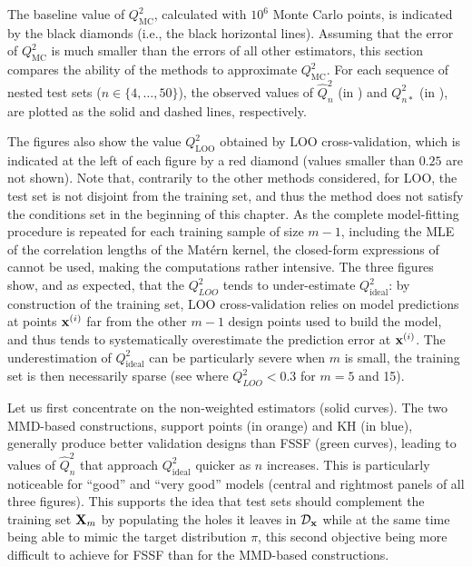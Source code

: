 The baseline value of $Q_{\mathrm{MC}}^2$, calculated with $10^6$ Monte Carlo points, is indicated by the black diamonds (i.e., the black horizontal lines).
Assuming that the error of $Q_{\mathrm{MC}}^2$ is much smaller than the errors of all other estimators, this section compares the ability of the methods to approximate $Q_{\mathrm{MC}}^2$. 
For each sequence of nested test sets ($n\in\{4,\ldots,50\}$), the observed values of $\widehat Q^2_n$ (in ) and $Q_{n*}^2$ (in ), are plotted as the solid and dashed lines, respectively. 

The figures also show the value $Q^2_{\mathrm{LOO}}$ obtained by LOO cross-validation, which is indicated at the left of each figure by a red diamond (values smaller than $0.25$ are not shown). 
Note that, contrarily to the other methods considered, for LOO, the test set is not disjoint from the training set, and thus the method does not satisfy the conditions set in the beginning of this chapter. 
As the complete model-fitting procedure is repeated for each training sample of size $m-1$, including the MLE of the correlation lengths of the Mat\'{e}rn kernel, the closed-form expressions of \citet{Dubrule83} cannot be used, making the computations rather intensive. 
The three figures show, and as expected, that the $Q_{LOO}^2$ tends to under-estimate $Q_{\mathrm{ideal}}^2$: by construction of the training set, LOO cross-validation relies on model predictions at points ${\bf x}^{(i)}$ far from the other $m-1$ design points used to build the model, and thus tends to systematically overestimate the prediction error at ${\bf x}^{(i)}$. 
The underestimation of $Q_{\mathrm{ideal}}^2$ can be particularly severe when $m$ is small, the training set is then necessarily sparse (see  where $Q_{LOO}^2<0.3$ for $m=5$ and 15). 

Let us first concentrate on the non-weighted estimators (solid curves). 
The two MMD-based constructions, support points (in orange) and KH (in blue), generally produce better validation designs than FSSF (green curves), leading to values of $\widehat Q^2_n$ that approach $Q_{\mathrm{ideal}}^2$ quicker as $n$ increases. 
This is particularly noticeable for ``good'' and ``very good'' models (central and rightmost panels of all three figures). 
This supports the idea that test sets should complement the training set ${\bf X}_m$ by populating the holes it leaves in $\mathcal{D}_{\bf x}$ while at the same time being able to mimic the target distribution $\pi$, this second objective being more difficult to achieve for FSSF than for the MMD-based constructions. 


